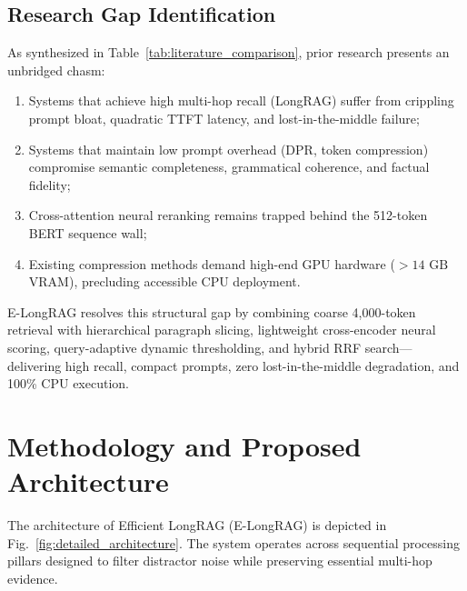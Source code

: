 \documentclass[lettersize,journal]{IEEEtran}
\begin{document}
\subsection{Research Gap Identification}
As synthesized in Table~\ref{tab:literature_comparison}, prior research presents an unbridged chasm:
\begin{enumerate}
    \item Systems that achieve high multi-hop recall (LongRAG) suffer from crippling prompt bloat, quadratic TTFT latency, and lost-in-the-middle failure;
    \item Systems that maintain low prompt overhead (DPR, token compression) compromise semantic completeness, grammatical coherence, and factual fidelity;
    \item Cross-attention neural reranking remains trapped behind the 512-token BERT sequence wall;
    \item Existing compression methods demand high-end GPU hardware ($>14\text{ GB}$ VRAM), precluding accessible CPU deployment.
\end{enumerate}
E-LongRAG resolves this structural gap by combining coarse 4,000-token retrieval with hierarchical paragraph slicing, lightweight cross-encoder neural scoring, query-adaptive dynamic thresholding, and hybrid RRF search---delivering high recall, compact prompts, zero lost-in-the-middle degradation, and 100\% CPU execution.

\section{Methodology and Proposed Architecture}
The architecture of Efficient LongRAG (E-LongRAG) is depicted in Fig.~\ref{fig:detailed_architecture}. The system operates across sequential processing pillars designed to filter distractor noise while preserving essential multi-hop evidence.
\end{document}
